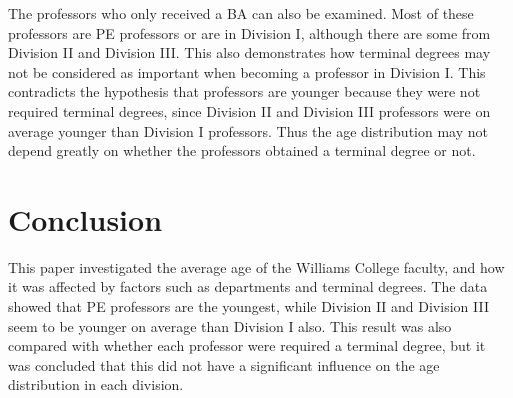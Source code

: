 \documentclass{article}\usepackage[]{graphicx}\usepackage[]{color}
\begin{document}
The professors who only received a BA can also be examined. Most of these professors are PE professors or
are in Division I, although there are some from Division II and Division III. This also demonstrates how
terminal degrees may not be considered as important when becoming a professor in Division I. This contradicts
the hypothesis that professors are younger because they were not required terminal degrees, since Division II
and Division III professors were on average younger than Division I professors. Thus the age distribution
may not depend greatly on whether the professors obtained a terminal degree or not.

\section{Conclusion}
This paper investigated the average age of the Williams College faculty, and how it was affected by
factors such as departments and terminal degrees. The data showed that PE professors are the youngest,
while Division II and Division III seem to be younger on average than Division I also. This result was also
compared with whether each professor were required a terminal degree, but it was concluded that this did not
have a significant influence on the age distribution in each division.
\end{document}
